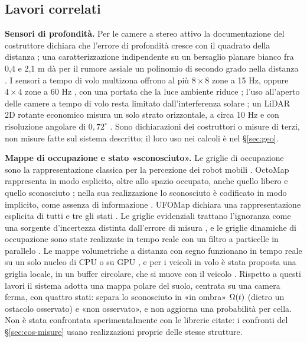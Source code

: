 \subsection{Lavori correlati}\label{sec:cos-correlati}

\textbf{Sensori di profondità.} Per le camere a stereo attivo la documentazione del costruttore dichiara che l'errore di profondità cresce con il quadrato della distanza \cite{realsense-taratura-profondita}; una caratterizzazione indipendente su un bersaglio planare bianco fra 0,4 e 2,1 m dà per il rumore assiale un polinomio di secondo grado nella distanza \cite{ahn2019}. I sensori a tempo di volo multizona offrono al più $8\times8$ zone a 15 Hz, oppure $4\times4$ zone a 60 Hz \cite{st-um2884}, con una portata che la luce ambiente riduce \cite{st-vl53l7cx}; l'uso all'aperto delle camere a tempo di volo resta limitato dall'interferenza solare \cite{qiu2023}; un LiDAR 2D rotante economico misura un solo strato orizzontale, a circa 10 Hz e con risoluzione angolare di $0{,}72^\circ$ \cite{slamtec-rplidar-c1}. Sono dichiarazioni dei costruttori o misure di terzi, non misure fatte sul sistema descritto; il loro uso nei calcoli è nel \S\ref{sec:geo}.

\textbf{Mappe di occupazione e stato «sconosciuto».} Le griglie di occupazione sono la rappresentazione classica per la percezione dei robot mobili \cite{elfes1989}. OctoMap rappresenta in modo esplicito, oltre allo spazio occupato, anche quello libero e quello sconosciuto \cite{hornung2013}; nella sua realizzazione lo sconosciuto è codificato in modo implicito, come assenza di informazione \cite{octomap}. UFOMap dichiara una rappresentazione esplicita di tutti e tre gli stati \cite{duberg2020}. Le griglie evidenziali trattano l'ignoranza come una sorgente d'incertezza distinta dall'errore di misura \cite{moras2011}, e le griglie dinamiche di occupazione sono state realizzate in tempo reale con un filtro a particelle in parallelo \cite{nuss2018}. Le mappe volumetriche a distanza con segno funzionano in tempo reale su un solo nucleo di CPU \cite{oleynikova2017} o su GPU \cite{millane2024,niessner2013}, e per i veicoli in volo è stata proposta una griglia locale, in un buffer circolare, che si muove con il veicolo \cite{usenko2017}. Rispetto a questi lavori il sistema adotta una mappa polare del suolo, centrata su una camera ferma, con quattro stati: separa lo sconosciuto in «in ombra» $\Omega(t)$ (dietro un ostacolo osservato) e «non osservato», e non aggiorna una probabilità per cella. Non è stata confrontata sperimentalmente con le librerie citate: i confronti del \S\ref{sec:cos-misure} usano realizzazioni proprie delle stesse strutture.

